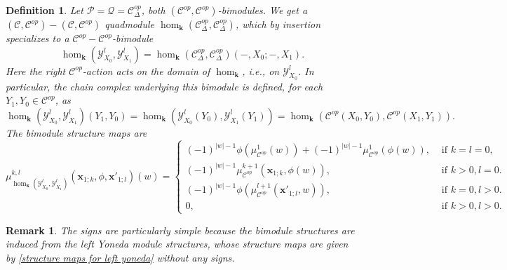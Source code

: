 \documentclass[11pt]{amsproc}
\def\K{{\mathbf{k}}}
\def\Y{\mathcal{Y}}
\def\cP{\mathcal{P}}
\def\cQ{\mathcal{Q}}
\def\cc{\mathcal{C}}
\def\D{\Delta}
\newtheorem{defn}[lem]{Definition}
\newtheorem{rem}[lem]{Remark}
\theoremstyle{remark}
\numberwithin{equation}{section}
\begin{document}
\begin{defn}\label{example: linear hom bimodule}
Let $\cP = \cQ = \cc^{op}_{\D}$, both $(\cc^{op}, \cc^{op})$-bimodules.
We get  a $(\cc, \cc^{op})-(\cc, \cc^{op})$ quadmodule $\hom_{\K}(\cc^{op}_{\D}, \cc^{op}_{\D})$,
which by insertion specializes to a $\cc^{op} - \cc^{op}$-bimodule
\begin{equation}\label{hom bimodule}
\hom_{\K}(\Y^{l}_{X_{0}}, \Y^{l}_{X_{1}}) = \hom_{\K}(\cc^{op}_{\D}, \cc^{op}_{\D}) (-, X_{0}; -, X_{1}).
\end{equation}
Here the right $\cc^{op}$-action acts on the domain of $\hom_{\K}$, i.e., on $\Y^{l}_{X_{0}}$.
In particular, the chain complex underlying this bimodule is defined, for each $Y_{1}, Y_{0} \in \cc^{op}$, as
\begin{equation}
\hom_{\K}(\Y^{l}_{X_{0}}, \Y^{l}_{X_{1}}) (Y_{1}, Y_{0}) = \hom_{\K}(\Y^{l}_{X_{0}}(Y_{0}), \Y^{l}_{X_{1}}(Y_{1})) = \hom_{\K}(\cc^{op}(X_{0}, Y_{0}), \cc^{op}(X_{1}, Y_{1})).
\end{equation}
The bimodule structure maps are
\begin{equation}\label{bimodule maps for linear hom}
\mu^{k, l}_{\hom_{\K}(\Y^{l}_{X_{0}}, \Y^{l}_{X_{1}})}(\mathbf{x}_{1;k}, \phi, \mathbf{x}'_{1;l})(w) = 
\begin{cases}
(-1)^{|w|-1} \phi(\mu^{1}_{\cc^{op}}(w)) + (-1)^{ |w| - 1} \mu^{1}_{\cc^{op}}(\phi(w)), & \text{ if } k=l=0, \\
(-1)^{|w|-1} \mu^{k+1}_{\cc^{op}}(\mathbf{x}_{1;k}, \phi(w)), & \text{ if } k >0, l = 0. \\
(-1)^{|w|-1} \phi(\mu^{l+1}_{\cc^{op}}(\mathbf{x}'_{1;l}, w)) , & \text{ if } k=0, l >0. \\
0, & \text{ if } k > 0, l > 0.
\end{cases}
\end{equation}
 \end{defn}
 
 \begin{rem}
 The signs are particularly simple because the bimodule structures are induced from the left Yoneda module structures,
 whose structure maps are given by \eqref{structure maps for left yoneda} without any signs.
 \end{rem}
 
\end{document}
